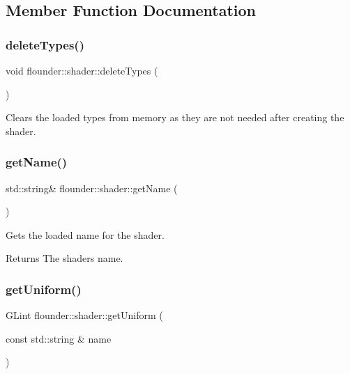 \subsection{Member Function Documentation}
\mbox{\label{classflounder_1_1shader_a12948c1607867de569f1cd596c923623}} 
\subsubsection{\texorpdfstring{delete\+Types()}{deleteTypes()}}
{\footnotesize\ttfamily void flounder\+::shader\+::delete\+Types (\begin{DoxyParamCaption}{ }\end{DoxyParamCaption})\hspace{0.3cm}{\ttfamily [private]}}



Clears the loaded types from memory as they are not needed after creating the shader. 

\mbox{\label{classflounder_1_1shader_a5971b780ec6535aeb0ca70fefd41daa9}} 
\subsubsection{\texorpdfstring{get\+Name()}{getName()}}
{\footnotesize\ttfamily std\+::string\& flounder\+::shader\+::get\+Name (\begin{DoxyParamCaption}{ }\end{DoxyParamCaption})\hspace{0.3cm}{\ttfamily [inline]}}



Gets the loaded name for the shader. 

\begin{DoxyReturn}{Returns}
The shaders name. 
\end{DoxyReturn}
\mbox{\label{classflounder_1_1shader_ab4d3af8b3ffe94ff901b15376215c2e2}} 
\subsubsection{\texorpdfstring{get\+Uniform()}{getUniform()}}
{\footnotesize\ttfamily G\+Lint flounder\+::shader\+::get\+Uniform (\begin{DoxyParamCaption}\item[{const std\+::string \&}]{name }\end{DoxyParamCaption})}



